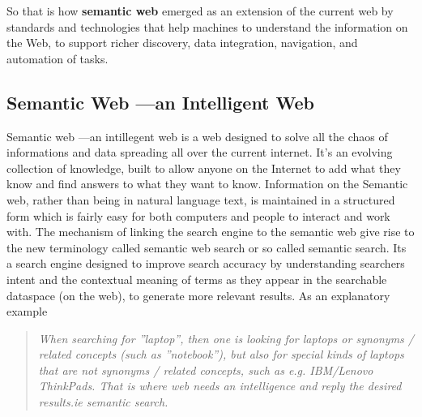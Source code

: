\documentclass[12pt,a4]{article}
\begin{document}
So that is how \textbf{semantic web} emerged as an extension of the current web by standards and technologies that help machines to understand the information on the Web, to support richer discovery, data integration, navigation, and automation of tasks.

\subsection{Semantic Web ---an Intelligent Web}
Semantic web ---an intillegent web is a web designed to solve all the chaos of informations and data spreading all over the current internet. It's an evolving collection of knowledge, built to allow anyone on the Internet to add what they know and find answers to what they want to know. Information on the Semantic web, rather than being in natural language text, is maintained in a structured form which is fairly easy for both computers and people to interact and work with. 
The mechanism of linking the search engine to the semantic web give rise to the new terminology called semantic web search or so called semantic search. Its a search engine designed to improve search accuracy by understanding searchers intent and the contextual meaning of terms as they appear in the searchable dataspace (on the web), to generate more relevant results. As an explanatory example
\begin{quote}\textit{When searching for ''laptop'', then one is looking for laptops or synonyms / related concepts (such as ''notebook''), but also for special kinds of laptops that are not synonyms / related concepts, such as e.g. IBM/Lenovo ThinkPads. That is where web needs an intelligence and reply the desired results.ie semantic search.}
\end{quote}
\end{document}
